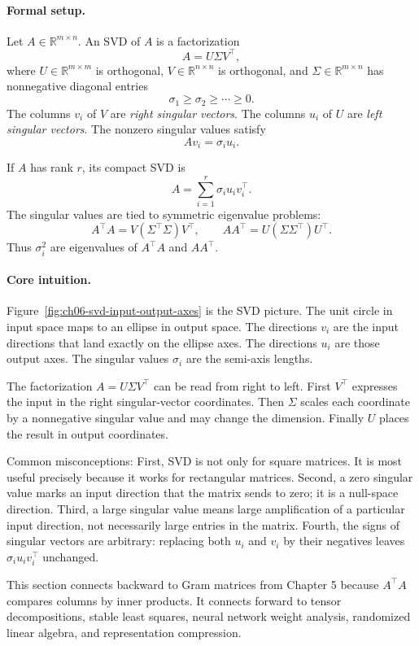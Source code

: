 \paragraph{Formal setup.}
Let \(A\in\mathbb{R}^{m\times n}\). An SVD of \(A\) is a factorization
\[
A=U\Sigma V^\top,
\]
where \(U\in\mathbb{R}^{m\times m}\) is orthogonal, \(V\in\mathbb{R}^{n\times n}\) is orthogonal, and \(\Sigma\in\mathbb{R}^{m\times n}\) has nonnegative diagonal entries
\[
\sigma_1\geq\sigma_2\geq\cdots\geq 0.
\]
The columns \(v_i\) of \(V\) are \emph{right singular vectors}. The columns \(u_i\) of \(U\) are \emph{left singular vectors}. The nonzero singular values satisfy
\[
Av_i=\sigma_i u_i.
\]

If \(A\) has rank \(r\), its compact SVD is
\[
A=\sum_{i=1}^r \sigma_i u_i v_i^\top.
\]
The singular values are tied to symmetric eigenvalue problems:
\[
A^\top A=V(\Sigma^\top\Sigma)V^\top,
\qquad
AA^\top=U(\Sigma\Sigma^\top)U^\top.
\]
Thus \(\sigma_i^2\) are eigenvalues of \(A^\top A\) and \(AA^\top\).

\paragraph{Core intuition.}
Figure~\ref{fig:ch06-svd-input-output-axes} is the SVD picture. The unit circle in input space maps to an ellipse in output space. The directions \(v_i\) are the input directions that land exactly on the ellipse axes. The directions \(u_i\) are those output axes. The singular values \(\sigma_i\) are the semi-axis lengths.

The factorization \(A=U\Sigma V^\top\) can be read from right to left. First \(V^\top\) expresses the input in the right singular-vector coordinates. Then \(\Sigma\) scales each coordinate by a nonnegative singular value and may change the dimension. Finally \(U\) places the result in output coordinates.

Common misconceptions: First, SVD is not only for square matrices. It is most useful precisely because it works for rectangular matrices. Second, a zero singular value marks an input direction that the matrix sends to zero; it is a null-space direction. Third, a large singular value means large amplification of a particular input direction, not necessarily large entries in the matrix. Fourth, the signs of singular vectors are arbitrary: replacing both \(u_i\) and \(v_i\) by their negatives leaves \(\sigma_i u_i v_i^\top\) unchanged.

This section connects backward to Gram matrices from Chapter 5 because \(A^\top A\) compares columns by inner products. It connects forward to tensor decompositions, stable least squares, neural network weight analysis, randomized linear algebra, and representation compression.

